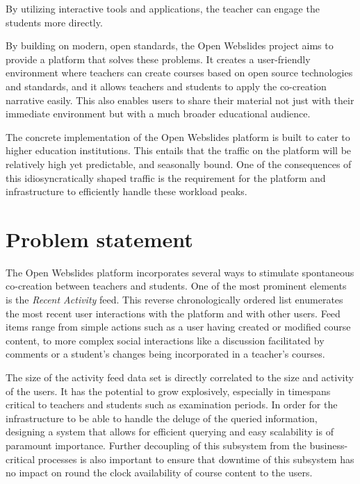By utilizing interactive tools and applications, the teacher can engage the students more directly.

By building on modern, open standards, the Open Webslides project \autocite{OpenWebslides2017} aims to provide a platform that solves these problems. It creates a user-friendly environment where teachers can create courses based on open source technologies and standards, and it allows teachers and students to apply the co-creation narrative easily. This also enables users to share their material not just with their immediate environment but with a much broader educational audience.

The concrete implementation of the Open Webslides platform is built to cater to higher education institutions. This entails that the traffic on the platform will be relatively high yet predictable, and seasonally bound. One of the consequences of this idiosyncratically shaped traffic is the requirement for the platform and infrastructure to efficiently handle these workload peaks.

\section{Problem statement}
\label{sec:problem-statement}

The Open Webslides platform incorporates several ways to stimulate spontaneous co-creation between teachers and students. One of the most prominent elements is the \textit{Recent Activity} feed. This reverse chronologically ordered list enumerates the most recent user interactions with the platform and with other users. Feed items range from simple actions such as a user having created or modified course content, to more complex social interactions like a discussion facilitated by comments or a student's changes being incorporated in a teacher's courses.

The size of the activity feed data set is directly correlated to the size and activity of the users. It has the potential to grow explosively, especially in timespans critical to teachers and students such as examination periods. In order for the infrastructure to be able to handle the deluge of the queried information, designing a system that allows for efficient querying and easy scalability is of paramount importance. Further decoupling of this subsystem from the business-critical processes is also important to ensure that downtime of this subsystem has no impact on round the clock availability of course content to the users.

